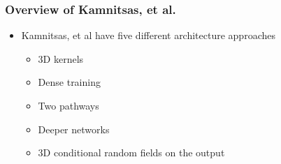 \documentclass{beamer}
\begin{document}
\begin{frame}
  \frametitle{Overview of Kamnitsas, et al.}
  \begin{itemize}
	\item Kamnitsas, et al have five different architecture approaches
	\pause
	\begin{itemize}
	  \item 3D kernels
	  \pause
	  \item Dense training
	  \pause
	  \item Two pathways
	  \pause
	  \item Deeper networks
	  \pause
	  \item 3D conditional random fields on the output
	\end{itemize}
  \end{itemize}
\end{frame}
\end{document}
